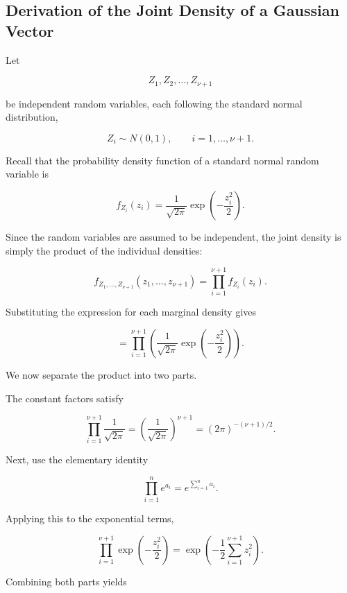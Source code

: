 \documentclass[11pt]{article}
\begin{document}
	\begin{mdframed}[
		linewidth=0.8pt,
		roundcorner=6pt,
		backgroundcolor=gray!5,
		linecolor=gray!60,
		innertopmargin=10pt,
		innerbottommargin=10pt,
		innerleftmargin=10pt,
		innerrightmargin=10pt
		]
		
		\subsection*{Derivation of the Joint Density of a Gaussian Vector}
		
		Let
		
		\[
		Z_1,Z_2,\ldots,Z_{\nu+1}
		\]
		
		be independent random variables, each following the standard normal
		distribution,
		
		\[
		Z_i\sim N(0,1),
		\qquad
		i=1,\ldots,\nu+1.
		\]
		
		Recall that the probability density function of a standard normal random
		variable is
		
		\[
		f_{Z_i}(z_i)
		=
		\frac{1}{\sqrt{2\pi}}
		\exp\left(-\frac{z_i^2}{2}\right).
		\]
		
		Since the random variables are assumed to be independent, the joint
		density is simply the product of the individual densities:
		
		\[
		f_{Z_1,\ldots,Z_{\nu+1}}
		(z_1,\ldots,z_{\nu+1})
		=
		\prod_{i=1}^{\nu+1}
		f_{Z_i}(z_i).
		\]
		
		Substituting the expression for each marginal density gives
		
		\[
		=
		\prod_{i=1}^{\nu+1}
		\left(
		\frac{1}{\sqrt{2\pi}}
		\exp\left(-\frac{z_i^2}{2}\right)
		\right).
		\]
		
		We now separate the product into two parts.
		
		The constant factors satisfy
		
		\[
		\prod_{i=1}^{\nu+1}
		\frac{1}{\sqrt{2\pi}}
		=
		\left(
		\frac{1}{\sqrt{2\pi}}
		\right)^{\nu+1}
		=
		(2\pi)^{-(\nu+1)/2}.
		\]
		
		Next, use the elementary identity
		
		\[
		\prod_{i=1}^{n}e^{a_i}
		=
		e^{\sum_{i=1}^{n}a_i}.
		\]
		
		Applying this to the exponential terms,
		
		\[
		\prod_{i=1}^{\nu+1}
		\exp\left(-\frac{z_i^2}{2}\right)
		=
		\exp\left(
		-\frac12
		\sum_{i=1}^{\nu+1}
		z_i^2
		\right).
		\]
		
		Combining both parts yields
		

\end{mdframed}
\end{document}
